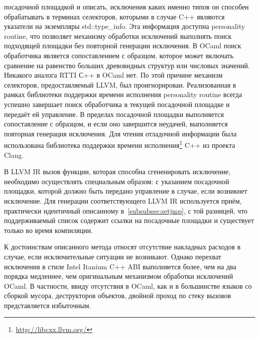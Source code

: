 \documentclass[a4paper, 12pt]{article}
\begin{document}
посадочной площадкой и описать, исключения каких именно типов он способен обрабатывать в терминах селекторов, которыми в
случае C++ являются указатели на экземпляры std::type\_info. Эта информация доступна personality routine, что позволяет
механизму обработки исключений выполнять поиск подходящей площадки без повторной генерации исключения. В OCaml поиск
обработчика является сопоставлением с образцом, которое может включать сравнение на равенство больших древовидных
структур или числовых значений. Никакого аналога RTTI С++ в OCaml нет. По этой причине механизм селекторов,
предоставляемый LLVM, был проигнорирован. Реализованная в рамках библиотеки поддержки времени исполнения personality
routine всегда успешно завершает поиск обработчика в текущей посадочной площадке и передаёт ей управление. В пределах
посадочной площадки выполняется сопоставление с образцом, и если оно завершится неудачей, выполняется повторная
генерация исключения. Для чтения отладочной информации была использована библиотека поддержки времени
исполнения\footnote{\url{http://libcxx.llvm.org/}} C++ из проекта Clang.

В LLVM IR вызов функции, которая способна сгененировать исключение, необходимо осуществлять специальным образом: с
указанием посадочной площадки, которой должно быть передано управление в случае, если возникнет исключение. Для
генерации соответствующего LLVM IR используется приём, практически идентичный описанному в~\ref{subsubsec:setjmp}, с той
разницей, что поддерживаемый список содержит ссылки на посадочные площадки и существует только во время компиляции.

К достоинствам описанного метода относят отсутствие накладных расходов в случае, если
исключительные ситуации не возникают. Однако перехват исключения в стиле Intel Itanium C++ ABI выполняется более, чем на
два порядка медленнее, чем оригинальным механизмом обработки исключений OCaml. В частности, ввиду отсутствия в OCaml,
как и в большинстве языков со сборкой мусора, деструкторов объектов, двойной проход по стеку вызовов представляется
избыточным.
\end{document}
